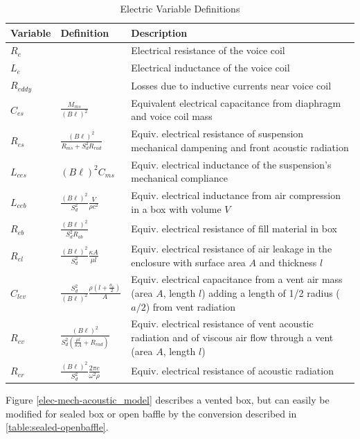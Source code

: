 \documentclass[10pt]{book}
\begin{document}
\begin{table}
\centering
\renewcommand{\arraystretch}{1.5}
\begin{tabularx}{\textwidth}{@{} ll X @{}}
\toprule
Variable & Definition & Description \\
\midrule
$R_e$ & & Electrical resistance of the voice coil\\
$L_e$ & & Electrical inductance of the voice coil\\
$R_{eddy}$ & & Losses due to inductive currents near voice coil\\
$C_{es}$ & $\frac{M_{ms}}{(B\ell)^2}$ & Equivalent electrical capacitance from diaphragm and voice coil mass\\
$R_{es}$ & $\frac{(B\ell)^2}{R_{ms}+S_d^2R_{rad}}$ & Equiv. electrical resistance of suspension mechanical dampening and front acoustic radiation\\
$L_{ces}$ & $(B\ell)^2C_{ms}$ & Equiv. electrical inductance of the suspension's mechanical compliance\\
$L_{ceb}$ & $\frac{(B\ell)^2}{S_d^2} \frac{V}{\rho c^2}$ & Equiv. electrical inductance from air compression in a box with volume $V$\\
$R_{eb}$ & $\frac{(B\ell)^2}{S_d^2 R_{ab}}$ & Equiv. electrical resistance of fill material in box\\
$R_{el}$ & $\frac{(B\ell)^2}{S_d^2 } \frac{\kappa A}{\mu l}$ & Equiv. electrical resistance of air leakage in the enclosure with surface area $A$ and thickness $l$\\
$C_{lev}$ & $\frac{S_d^2}{(B\ell)^2}\frac{\rho \left(l+\frac{a_v}{2}\right)}{A}$ & Equiv. electrical capacitance from a vent air mass (area $A$, length $l$) adding a length of 1/2 radius ($a/2$) from vent radiation\\
$R_{ev}$ & $\frac{(B\ell)^2}{S_d^2\left( \frac{\mu l}{\kappa A}+R_{rad}\right)}$ & Equiv. electrical resistance of vent acoustic radiation and of viscous air flow through a vent (area $A$, length $l$)\\
$R_{er}$ & $\frac{(B\ell)^2}{S_d^2}\frac{2\pi c}{\omega^2 \rho}$& Equiv. electrical resistance of acoustic radiation\\
\bottomrule
\end{tabularx}
\caption{Electric Variable Definitions}\label{table:variables}
\end{table}

Figure \ref{elec-mech-acoustic_model} describes a vented box, but can easily be modified for sealed box or open baffle by the conversion described in \ref{table:sealed-openbaffle}.
\end{document}

